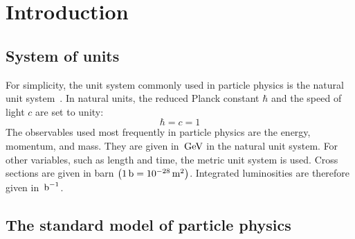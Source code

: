 \chapter{Introduction}\label{chap:introduction}
\section{System of units}\label{sec:units}

For simplicity, the unit system commonly used in particle physics is the natural unit system~\cite{UnitSystem}. In natural units, the reduced Planck constant $\hbar$ and the speed of light $c$ are set to unity:
\begin{equation}
 \hbar=c=1
\end{equation}
The observables used most frequently in particle physics are the energy, momentum, and mass. They are given in $\,\text{Ge\hspace{-.08em}V}$ in the natural unit system. For other variables, such as length and time, the metric unit system is used. Cross sections are given in barn $\left(1\,\text{b}=10^{-28}\,\text{m}^2\right)$. Integrated luminosities are therefore given in $\mbox{\ensuremath{\,\text{b}^\text{$-$1}}}$.

\section{The standard model of particle physics}\label{sec:SM}

